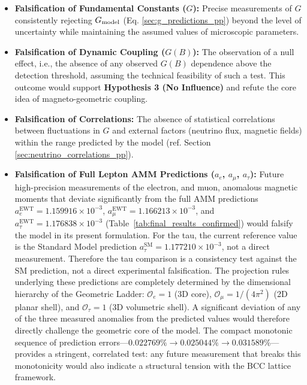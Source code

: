 \documentclass[10pt,a4paper]{article}
\begin{document}
\begin{itemize}
	\item \textbf{Falsification of Fundamental Constants ($G$):} Precise measurements of $G$ consistently rejecting $G_{\rm model}$ (Eq. \ref{sec:g_predictions_pp}) beyond the level of uncertainty while maintaining the assumed values of microscopic parameters.
	\item \textbf{Falsification of Dynamic Coupling ($G(B)$):} The observation of a null effect, i.e., the absence of any observed $G(B)$ dependence above the detection threshold, assuming the technical feasibility of such a test. This outcome would support \textbf{Hypothesis 3 (No Influence)} and refute the core idea of magneto-geometric coupling.
	\item \textbf{Falsification of Correlations:} The absence of statistical correlations between fluctuations in $G$ and external factors (neutrino flux, magnetic fields) within the range predicted by the model (ref. Section \ref{sec:neutrino_correlations_pp}).
\item \textbf{Falsification of Full Lepton AMM Predictions ($a_e$, $a_{\mu}$, $a_{\tau}$):} 
Future high-precision measurements of the electron, and muon, anomalous 
magnetic moments that deviate significantly from the full AMM predictions 
$a_e^{\text{EWT}} = 1.159916 \times 10^{-3}$, 
$a_{\mu}^{\text{EWT}} = 1.166213 \times 10^{-3}$, and 
$a_{\tau}^{\text{EWT}} = 1.176838 \times 10^{-3}$ 
(Table~\ref{tab:final_results_confirmed}) would falsify the model in its 
present formulation. For the tau, the current reference value is the Standard Model prediction
\(a_{\tau}^{\text{SM}} = 1.177210 \times 10^{-3}\), not a direct measurement.
Therefore the tau comparison is a consistency test against the SM prediction,
not a direct experimental falsification. The projection rules underlying these predictions are 
completely determined by the dimensional hierarchy of the Geometric Ladder: 
$\mathcal{O}_e = 1$ (3D core), $\mathcal{O}_\mu = 1/(4\pi^2)$ (2D planar 
shell), and $\mathcal{O}_\tau = 1$ (3D volumetric shell). A significant 
deviation of any of the three measured anomalies from the predicted values 
would therefore directly challenge the geometric core of the model. The 
compact monotonic sequence of prediction errors---$0.022769\% \to 0.025044\% 
\to 0.031589\%$---provides a stringent, correlated test: any future measurement 
that breaks this monotonicity would also indicate a structural tension with 
the BCC lattice framework.
\end{itemize}
\end{document}

